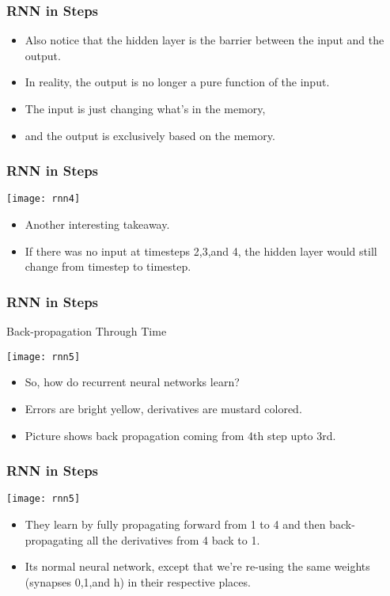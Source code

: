 \begin{frame}[fragile] \frametitle{RNN in Steps}
\begin{itemize}
\item Also notice that the hidden layer is the barrier between the input and the output. 
\item In reality, the output is no longer a pure function of the input. 
\item The input is just changing what's in the memory, 
\item and the output is exclusively based on the memory. 
\end{itemize}
\end{frame}

\begin{frame}[fragile] \frametitle{RNN in Steps}
\begin{center}
\texttt{[image: rnn4]}
\end{center}
\begin{itemize}
\item Another interesting takeaway. 
\item If there was no input at timesteps 2,3,and 4, the hidden layer would still change from timestep to timestep. 
\end{itemize}
\end{frame}

\begin{frame}[fragile] \frametitle{RNN in Steps}

Back-propagation Through Time

\begin{center}
\texttt{[image: rnn5]}
\end{center}
\begin{itemize}
\item So, how do recurrent neural networks learn? 
\item Errors are bright yellow, derivatives are mustard colored.
\item Picture shows back propagation coming from 4th step upto 3rd.
\end{itemize}
\end{frame}

\begin{frame}[fragile] \frametitle{RNN in Steps}
\begin{center}
\texttt{[image: rnn5]}
\end{center}
\begin{itemize}
\item They learn by fully propagating forward from 1 to 4 and then back-propagating all the derivatives from 4 back to 1. 
\item Its normal neural network, except that we're re-using the same weights (synapses 0,1,and h) in their respective places. 
\end{itemize}
\end{frame}


